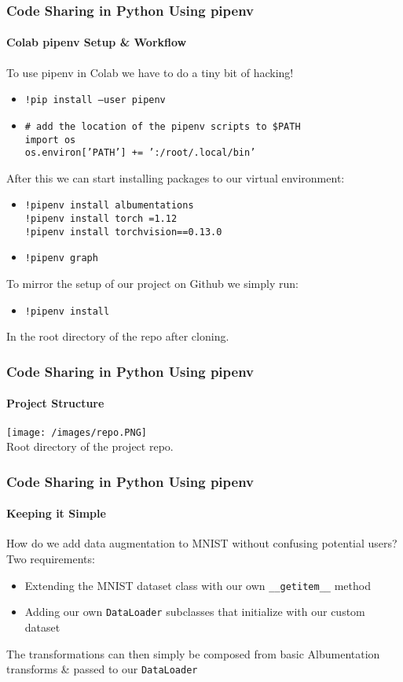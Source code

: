 \documentclass{beamer}
\begin{document}
\begin{frame}
\frametitle{Code Sharing in Python Using pipenv}
\framesubtitle{Colab pipenv Setup \& Workflow}
To use pipenv in Colab we have to do a tiny bit of hacking!
\begin{itemize}
    \item \texttt{!pip install --user pipenv}
    \item \texttt{\# add the location of the pipenv scripts to \$PATH\\
    import os\\
    os.environ['PATH'] += ':/root/.local/bin'}
\end{itemize}
After this we can start installing packages to our virtual environment: 
\begin{itemize}
    \item \texttt{!pipenv install albumentations\\
    !pipenv install torch~=1.12\\
    !pipenv install torchvision==0.13.0}
    \item \texttt{!pipenv graph}
\end{itemize}
To mirror the setup of our project on Github we simply run:
\begin{itemize}
    \item \texttt{!pipenv install}
\end{itemize}
In the root directory of the repo after cloning.
\end{frame}

\begin{frame}
\frametitle{Code Sharing in Python Using pipenv}
\framesubtitle{Project Structure}
\texttt{[image: /images/repo.PNG]}\\
Root directory of the project repo.
\end{frame}

\begin{frame}
\frametitle{Code Sharing in Python Using pipenv}
\framesubtitle{Keeping it Simple}
How do we add data augmentation to MNIST without confusing potential users?\\
\medskip
Two requirements:\\
\medskip
\begin{itemize}
    \item Extending the MNIST dataset class with our own \texttt{\_\_getitem\_\_} method 
    \item Adding our own \texttt{DataLoader} subclasses that initialize with our custom dataset
\end{itemize}
\medskip
The transformations can then simply be composed from basic Albumentation transforms \& passed to our \texttt{DataLoader}
\end{frame}
\end{document}
